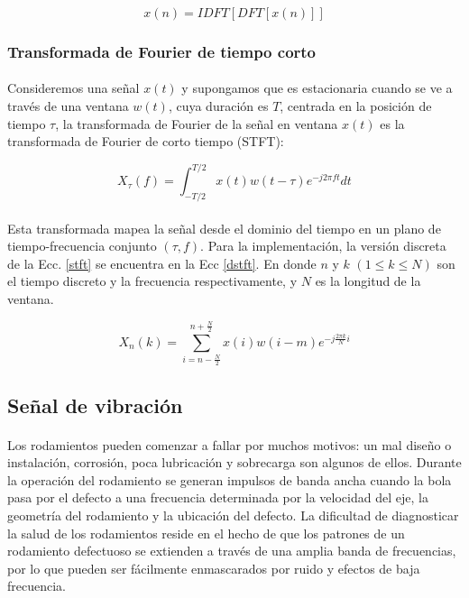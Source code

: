 \documentclass[12pt]{article}
\begin{document}
\begin{equation}
\label{condition}
x(n) = IDFT[DFT[x(n)]]
\end{equation}

\subsubsection{Transformada de Fourier de tiempo corto}
\paragraph{}
Consideremos una señal $x(t)$ y supongamos que es estacionaria cuando se ve a través de una ventana $w(t)$, cuya duración es $T$, centrada en la posición de tiempo $\tau$, la transformada de Fourier de la señal en ventana $x(t)$ es la transformada de Fourier de corto tiempo \cite{yufeng} (STFT):

\begin{equation}
\label{stft}
X_{\tau}(f)=\int_{-T/2}^{T/2}x(t)w(t-\tau)e^{-j2{\pi}ft}dt
\end{equation}

\paragraph{}
Esta transformada mapea la señal desde el dominio del tiempo en un plano de tiempo-frecuencia conjunto $(\tau,f)$. Para la implementación, la versión discreta de la Ecc. \ref{stft} se encuentra en la Ecc \ref{dstft}. En donde $n$ y $k$ $(1{\leq}k{\leq}N)$ son el tiempo discreto y la frecuencia respectivamente, y $N$ es la longitud de la ventana.

\begin{equation}
\label{dstft}
X_{n}(k)=\sum_{i=n-\frac{N}{2}}^{n+\frac{N}{2}}x(i)w(i-m)e^{-j\frac{2{\pi}k}{N}i}
\end{equation}

\subsection{Señal de vibración}
\paragraph{}
Los rodamientos pueden comenzar a fallar por muchos motivos: un mal diseño o instalación, corrosión, poca lubricación y sobrecarga son algunos de ellos. Durante la operación del rodamiento se generan impulsos de banda ancha cuando la bola pasa por el defecto a una frecuencia determinada por la velocidad del eje, la geometría del rodamiento y la ubicación del defecto. La dificultad de diagnosticar la salud de los rodamientos reside en el hecho de que los patrones de un rodamiento defectuoso se extienden a través de una amplia banda de frecuencias, por lo que pueden ser fácilmente enmascarados por ruido y efectos de baja frecuencia.
\end{document}
